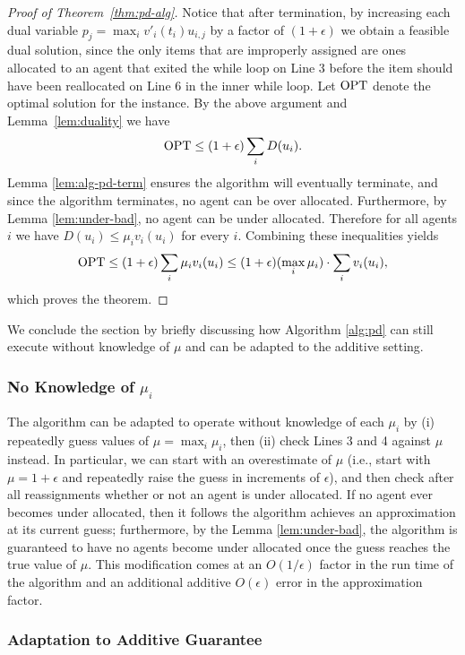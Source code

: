 \begin{proof}[Proof of Theorem~\ref{thm:pd-alg}]


Notice that after termination, by increasing each dual variable $p_j = \max_{i} v'_i(t_i)u_{i,j}$ by a factor of $(1+\epsilon)$ we obtain a feasible dual solution, since the only items that are improperly assigned are ones allocated to an agent that exited the while loop on Line 3 before the item should have been reallocated on Line 6 in the inner while loop. Let $\mathrm{OPT}$ denote the optimal solution for the instance. By the above argument and Lemma~\ref{lem:duality} we have
\[
\mathrm{OPT} \leq (1+\epsilon)\sum_i D(u_i).
\]
Lemma \ref{lem:alg-pd-term} ensures the algorithm will eventually terminate, and since the algorithm terminates, no agent can be over allocated.  Furthermore, by Lemma \ref{lem:under-bad}, no agent can be under allocated. Therefore for all agents $i$ we have $D(u_i) \leq \mu_i v_i(u_i)$ for every $i$. Combining these inequalities yields
\[
\mathrm{OPT} \leq (1+\epsilon)\sum_i \mu_i v_i(u_i) \leq (1+\epsilon) (\max_i \mu_i)\cdot \sum_i v_i(u_i),
\]
which proves the theorem.
\end{proof}
We conclude the section by briefly discussing how
Algorithm \ref{alg:pd} can still execute without knowledge of $\mu$ and can be adapted to the additive setting. 


\subsubsection{No Knowledge of $\mu_i$} The algorithm can be adapted to operate without knowledge of each $\mu_i$ by  (i) repeatedly guess values of $\mu = \max_i\mu_i$, then (ii) check Lines 3 and 4 against $\mu$ instead.
In particular, we can start with an overestimate of $\mu$ 
(i.e., start with $\mu = 1+\epsilon$ and repeatedly raise the guess in increments of $\epsilon$), and then check after all reassignments whether 
or not an agent is under allocated. If no agent ever becomes under allocated, then it follows the algorithm achieves an approximation at its current guess; furthermore, by the Lemma \ref{lem:under-bad}, the algorithm is guaranteed to have no agents become under allocated once the guess reaches the true value of $\mu$. This modification comes at an $O(1/\epsilon)$ factor in the run time of the algorithm and an additional additive $O(\epsilon)$ error in the approximation factor. 

\subsubsection{Adaptation to Additive Guarantee}
\label{subsec:additive} 

